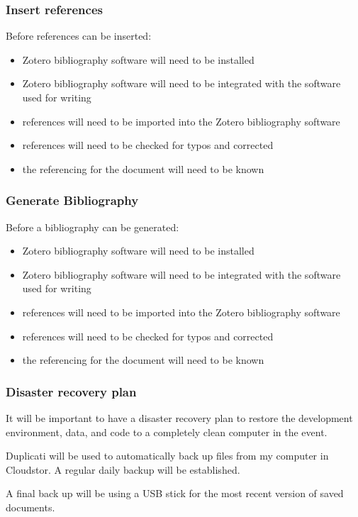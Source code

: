 \documentclass{article}
\begin{document}
\subsubsection*{Insert references}

Before references can be inserted:
\begin{itemize}
    \item Zotero bibliography software will need to be installed
    \item Zotero bibliography software will need to be integrated with the software used for writing
    \item references will need to be imported into the Zotero bibliography software
    \item references will need to be checked for typos and corrected
    \item the referencing for the document will need to be known
\end{itemize}

\subsubsection*{Generate Bibliography}

Before a bibliography can be generated:
\begin{itemize}
    \item Zotero bibliography software will need to be installed
    \item Zotero bibliography software will need to be integrated with the software used for writing
    \item references will need to be imported into the Zotero bibliography software
    \item references will need to be checked for typos and corrected
    \item the referencing for the document will need to be known
\end{itemize}

\subsubsection*{Disaster recovery plan}

It will be important to have a disaster recovery plan to restore the development environment, data, and code to a completely clean computer in the event.

Duplicati will be used to automatically back up files from my computer in Cloudstor. A regular daily backup will be established.

A final back up will be using a USB stick for the most recent version of saved documents. 
\end{document}
